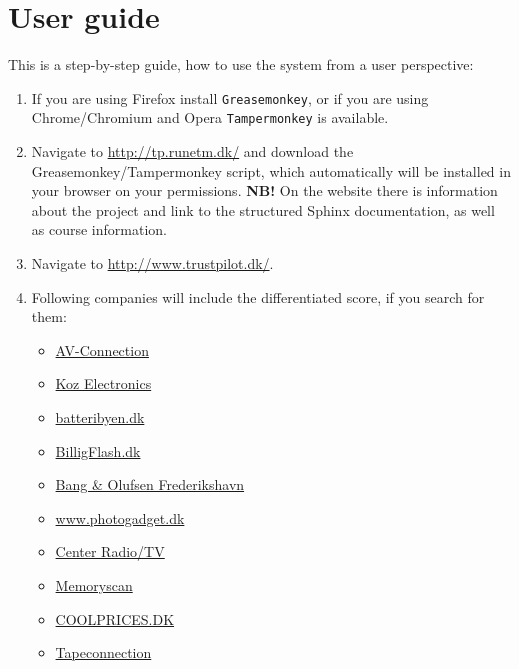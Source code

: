 \documentclass[10pt]{IEEEtran}
\begin{document}



\clearpage
\onecolumn
\appendices

\section{User guide}
This is a step-by-step guide, how to use the system from a user perspective:
\begin{enumerate}
	\item If you are using Firefox install \texttt{Greasemonkey}\cite{GreaseMonkey}, or if you are using Chrome/Chromium and Opera \texttt{Tampermonkey}\cite{TamperMonkey} is available.
	\item Navigate to \url{http://tp.runetm.dk/} and download the Greasemonkey/Tampermonkey script, which automatically will be installed in your browser on your permissions. \newline
	\textbf{NB!} On the website there is information about the project and link to the structured Sphinx documentation, as well as course information.
	\item Navigate to \url{http://www.trustpilot.dk/}.
	\item Following companies will include the differentiated score, if you search for them:
	\begin{itemize}
		\item \href{http://www.trustpilot.dk/review/www.av-connection.dk}{AV-Connection}
		\item \href{http://www.trustpilot.dk/review/www.koz.dk}{Koz Electronics}
		\item \href{http://www.trustpilot.dk/review/www.batteribyen.dk}{batteribyen.dk}
		\item \href{http://www.trustpilot.dk/review/www.billigflash.dk}{BilligFlash.dk}
		\item \href{http://www.trustpilot.dk/review/www.b-o.dk}{Bang \& Olufsen Frederikshavn}
		\item \href{http://www.trustpilot.dk/review/www.photogadget.dk}{www.photogadget.dk}
		\item \href{http://www.trustpilot.dk/review/www.crtv.dk}{Center Radio/TV}
		\item \href{http://www.trustpilot.dk/review/www.memoryscan.dk}{Memoryscan}
		\item \href{http://www.trustpilot.dk/review/www.coolprices.dk}{COOLPRICES.DK}
		\item \href{http://www.trustpilot.dk/review/tapeconnectio.dk}{Tapeconnection}

\end{itemize}
\end{enumerate}
\end{document}
